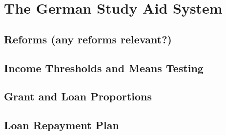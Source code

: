 \section{The German Study Aid System} \label{section:the-german-study-aid-system}


\subsection{Reforms (any reforms relevant?)} \label{subsection:reforms}

\subsection{Income Thresholds and Means Testing} \label{subsection:thresholds}
\subsection{Grant and Loan Proportions} \label{subsection:grant-to-loan-proportion}
\subsection{Loan Repayment Plan} \label{subsection:grant-to-loan-proportion}
